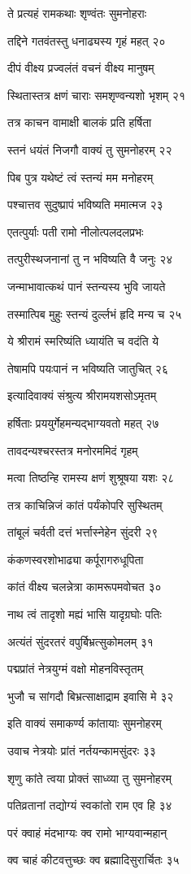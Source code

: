 ते प्रत्यहं रामकथाः शृण्वंतः सुमनोहराः

तद्दिने गतवंतस्तु धनाढ्यस्य गृहं महत् २०

दीपं वीक्ष्य प्रज्वलंतं वचनं वीक्ष्य मानुषम्

स्थितास्तत्र क्षणं चाराः समशृण्वन्यशो भृशम् २१

तत्र काचन वामाक्षी बालकं प्रति हर्षिता

स्तनं धयंतं निजगौ वाक्यं तु सुमनोहरम् २२

पिब पुत्र यथेष्टं त्वं स्तन्यं मम मनोहरम्

पश्चात्तव सुदुष्प्रापं भविष्यति ममात्मज २३

एतत्पुर्याः पती रामो नीलोत्पलदलप्रभः

तत्पुरीस्थजनानां तु न भविष्यति वै जनुः २४

जन्माभावात्कथं पानं स्तन्यस्य भुवि जायते

तस्मात्पिब मुहुः स्तन्यं दुर्ल्लभं हृदि मन्य च २५

ये श्रीरामं स्मरिष्यंति ध्यायंति च वदंति ये

तेषामपि पयःपानं न भविष्यति जातुचित् २६

इत्यादिवाक्यं संश्रुत्य श्रीरामयशसोऽमृतम्

हर्षिताः प्रययुर्गेहमन्यद्भाग्यवतो महत् २७

तावदन्यश्चरस्तत्र मनोरममिदं गृहम्

मत्वा तिष्ठन्हि रामस्य क्षणं शुश्रूषया यशः २८

तत्र काचिन्निजं कांतं पर्यंकोपरि सुस्थितम्

तांबूलं चर्वती दत्तं भर्त्तास्नेहेन सुंदरी २९

कंकणस्वरशोभाढ्या कर्पूरागरुधूपिता

कांतं वीक्ष्य चलन्नेत्रा कामरूपमवोचत ३०

नाथ त्वं तादृशो मह्यं भासि यादृग्रघोः पतिः

अत्यंतं सुंदरतरं वपुर्बिभ्रत्सुकोमलम् ३१

पद्मप्रांतं नेत्रयुग्मं वक्षो मोहनविस्तृतम्

भुजौ च सांगदौ बिभ्रत्साक्षाद्राम इवासि मे ३२

इति वाक्यं समाकर्ण्य कांतायाः सुमनोहरम्

उवाच नेत्रयोः प्रांतं नर्तयन्कामसुंदरः ३३

शृणु कांते त्वया प्रोक्तं साध्व्या तु सुमनोहरम्

पतिव्रतानां तद्योग्यं स्वकांतो राम एव हि ३४

परं क्वाहं मंदभाग्यः क्व रामो भाग्यवान्महान्

क्व चाहं कीटवत्तुच्छः क्व ब्रह्मादिसुरार्चितः ३५

